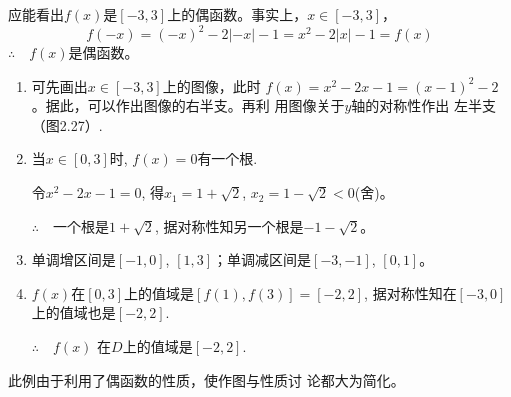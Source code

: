 \begin{solution}
    应能看出$f(x)$是$[-3,3]$上的偶函数。事实上，$x\in[-3,3]$，
\[f(-x)=(-x)^2-2|-x|-1=x^2-2|x|-1=f(x)\]
$\therefore\quad f(x)$是偶函数。

\begin{enumerate}[(1)]
    \item 可先画出$x\in[-3,3]$上的图像，此时
$f(x)=x^2-2x-1=(x-1)^2-2$。据此，可以作出图像的右半支。再利
用图像关于$y$轴的对称性作出
左半支（图2.27）.
\item 当$x\in[0,3]$时, $f(x)=0$有一个根.

令$x^{2}-2x-1=0$, 得$x_1= 1+ \sqrt {2}$, $x_2= 1- \sqrt {2}< 0$(舍)。

$\therefore\quad$一个根是$1+\sqrt2$, 据对称性知另一个根是$-1-\sqrt{2}$。

\item 单调增区间是$[-1,0]$, $[1,3]$；单调减区间是$[-3,-1]$, $[0,1]$。
\item $f(x)$在$[0,3]$上的值域是$[f(1), f(3)]=[-2,2]$, 据对称性知在$[-3,0]$上的值域也是$[-2,2]$.

$\therefore\quad f(x)$
在$D$上的值域是$[-2,2]$.
\end{enumerate}
\end{solution}

\begin{note}
    此例由于利用了偶函数的性质，使作图与性质讨
论都大为简化。
\end{note}

